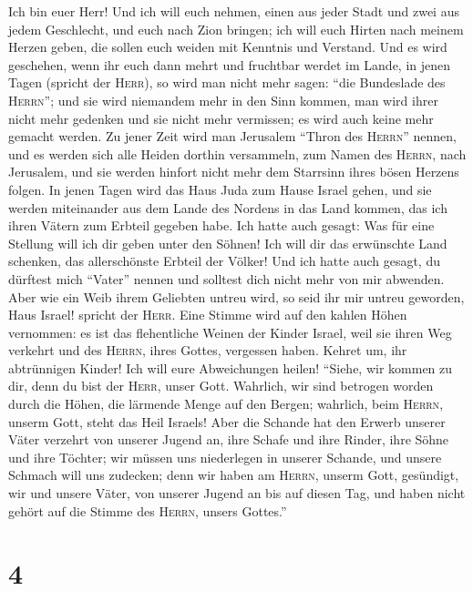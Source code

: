 Ich bin euer Herr! Und ich will euch nehmen, einen aus jeder Stadt und
zwei aus jedem Geschlecht, und euch nach Zion bringen; 
ich will euch Hirten nach meinem Herzen geben, die sollen euch weiden
mit Kenntnis und Verstand.  Und es wird geschehen, wenn
ihr euch dann mehrt und fruchtbar werdet im Lande, in jenen Tagen
(spricht der \textsc{Herr}), so wird man nicht mehr sagen: ``die
Bundeslade des \textsc{Herrn}''; und sie wird niemandem mehr in den Sinn
kommen, man wird ihrer nicht mehr gedenken und sie nicht mehr vermissen;
es wird auch keine mehr gemacht werden.  Zu jener Zeit
wird man Jerusalem ``Thron des \textsc{Herrn}'' nennen, und es werden
sich alle Heiden dorthin versammeln, zum Namen des \textsc{Herrn}, nach
Jerusalem, und sie werden hinfort nicht mehr dem Starrsinn ihres bösen
Herzens folgen.  In jenen Tagen wird das Haus Juda zum
Hause Israel gehen, und sie werden miteinander aus dem Lande des Nordens
in das Land kommen, das ich ihren Vätern zum Erbteil gegeben habe.
 Ich hatte auch gesagt: Was für eine Stellung will ich
dir geben unter den Söhnen! Ich will dir das erwünschte Land schenken,
das allerschönste Erbteil der Völker! Und ich hatte auch gesagt, du
dürftest mich ``Vater'' nennen und solltest dich nicht mehr von mir
abwenden.  Aber wie ein Weib ihrem Geliebten untreu wird,
so seid ihr mir untreu geworden, Haus Israel! spricht der \textsc{Herr}.
 Eine Stimme wird auf den kahlen Höhen vernommen: es ist
das flehentliche Weinen der Kinder Israel, weil sie ihren Weg verkehrt
und des \textsc{Herrn}, ihres Gottes, vergessen haben. 
Kehret um, ihr abtrünnigen Kinder! Ich will eure Abweichungen heilen!
``Siehe, wir kommen zu dir, denn du bist der \textsc{Herr}, unser Gott.
 Wahrlich, wir sind betrogen worden durch die Höhen, die
lärmende Menge auf den Bergen; wahrlich, beim \textsc{Herrn}, unserm
Gott, steht das Heil Israels!  Aber die Schande hat den
Erwerb unserer Väter verzehrt von unserer Jugend an, ihre Schafe und
ihre Rinder, ihre Söhne und ihre Töchter;  wir müssen uns
niederlegen in unserer Schande, und unsere Schmach will uns zudecken;
denn wir haben am \textsc{Herrn}, unserm Gott, gesündigt, wir und unsere
Väter, von unserer Jugend an bis auf diesen Tag, und haben nicht gehört
auf die Stimme des \textsc{Herrn}, unsers Gottes.''

\hypertarget{section-3}{%
\section{4}\label{section-3}}

